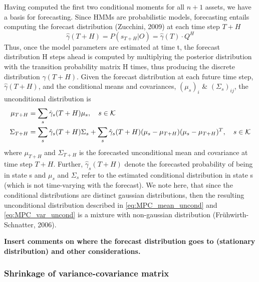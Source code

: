 Having computed the first two conditional moments for all $n+1$ assets, we have a basis for forecasting. Since HMMs are probabilistic models, forecasting entails computing the forecast distribution (Zucchini, 2009) at each time step $T+H$
\begin{equation}
    \hat\gamma(T+H) = P(s_{T+H}| O) = \hat\gamma(T) \cdot Q^H
\end{equation}
Thus, once the model parameters are estimated at time t, the forecast distribution H steps ahead is computed by multiplying the posterior distribution with the transition probability matrix H times, thus producing the discrete distribution $\hat\gamma(T+H)$. Given the forecast distribution at each future time step, $\hat\gamma(T+H)$, and the conditional means and covariances, $(\mu_{s})_i$ \& $(\Sigma_{s})_{ij}$, the unconditional distribution is
\begin{align}
    \mu_{T+H} &= \sum_s \hat\gamma_s(T+H) \mu_s,
    \quad s \in\operatorname{\mathcal{K}} \label{eq:MPC_mean_uncond} \\
    \Sigma_{T+H} &= \sum_s \hat\gamma_s(T+H) \Sigma_s + \sum_s \hat\gamma_s(T+H) (\mu_s-\mu_{T+H})(\mu_s-\mu_{T+H})^T ,
    \quad s\in\operatorname{\mathcal{K}}  \label{eq:MPC_var_uncond}
\end{align}
where $\mu_{T+H}$ and $\Sigma_{T+H}$ is the forecasted unconditional mean and covariance at time step $T+H$. Further, $\hat\gamma_s(T+H)$ denote the forecasted probability of being in state s and $\mu_s$ and $\Sigma_s$ refer to the estimated conditional distribution in state s (which is not time-varying with the forecast). We note here, that since the conditional distributions are distinct gaussian distributions, then the resulting unconditional distribution described in \cref{eq:MPC_mean_uncond} and \cref{eq:MPC_var_uncond} is a mixture with non-gaussian distribution (Frühwirth-Schnatter, 2006).


\textbf{Insert comments on where the forecast distribution goes to (stationary distribution) and other considerations.}

\subsubsection{Shrinkage of variance-covariance matrix}

